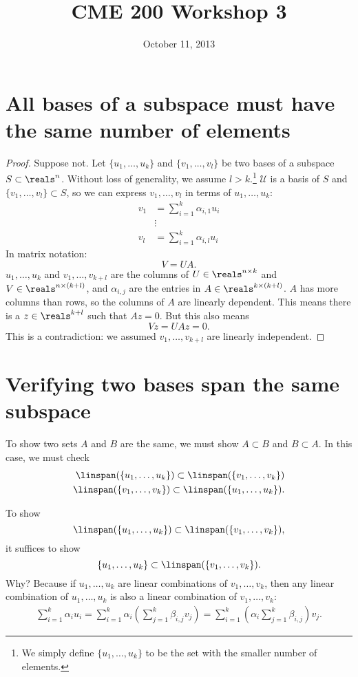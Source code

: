 \documentclass[preprint]{imsart}
\numberwithin{equation}{section}
\numberwithin{equation}{section}
\theoremstyle{plain}
\theoremstyle{remark}
\newcommand{\cU}{\mathcal{U}}
\begin{document}
\begin{frontmatter}
\title{CME 200 Workshop 3}
\begin{aug}
\author{October 11, 2013}
\end{aug}
\end{frontmatter}

\section{All bases of a subspace must have the same number of elements}

\begin{proof}
Suppose not. Let $\{u_1,\dots,u_k\}$ and $\{v_1,\dots,v_l\}$ be two bases of a subspace $S\subset\reals^n$. Without loss of generality, we assume $l > k$.\footnote{We simply define $\{u_1,\dots,u_k\}$ to be the set with the smaller number of elements.} $\cU$ is a basis of $S$ and $\{v_1,\dots,v_l\}\subset S$, so we can express $v_1,\dots,v_l$ in terms of $u_1,\dots,u_k$:
\begin{align*}
v_1 &= \sum_{i=1}^k \alpha_{i,1}u_i \\
&\vdots \\
v_l &= \sum_{i=1}^k \alpha_{i,l} u_i
\end{align*}
In matrix notation: 
$$
V = UA.
$$
$u_1,\dots,u_k$ and $v_1,\dots,v_{k+l}$ are the columns of $U\in\reals^{n\times k}$ and $V\in\reals^{n\times(k+l)}$, and $\alpha_{i,j}$ are the entries in $A\in\reals^{k\times(k+l)}$. $A$ has more columns than rows, so the columns of $A$ are linearly dependent. This means there is a $z\in\reals^{k+l}$ such that $Az = 0$. But this also means
$$
Vz = UAz = 0.
$$
This is a contradiction: we assumed $v_1,\dots,v_{k+l}$ are linearly independent.
\end{proof}

\section{Verifying two bases span the same subspace}

To show two sets $A$ and $B$ are the same, we must show $A\subset B$ and $B\subset A$. In this case, we must check
\begin{align*}
\linspan(\{u_1,\dots,u_k\})\subset \linspan(\{v_1,\dots,v_k\}) \\
\linspan(\{v_1,\dots,v_k\})\subset \linspan(\{u_1,\dots,u_k\}).
\end{align*}

To show 
$$
\linspan(\{u_1,\dots,u_k\})\subset \linspan(\{v_1,\dots,v_k\}),
$$
it suffices to show 
$$
\{u_1,\dots,u_k\}\subset\linspan(\{v_1,\dots,v_k\}).
$$
Why? Because if $u_1,\dots,u_k$ are linear combinations of $v_1,\dots,v_k$, then any linear combination of $u_1,\dots,u_k$ is also a linear combination of $v_1,\dots,v_k$:
\begin{align*}
\sum_{i=1}^k\alpha_iu_i = \sum_{i=1}^k\alpha_i\left(\sum_{j=1}^k\beta_{i,j}v_j\right) = \sum_{i=1}^k\left(\alpha_i\sum_{j=1}^k\beta_{i,j}\right)v_j.
\end{align*}
\end{document}
